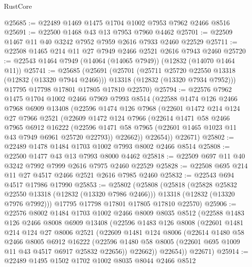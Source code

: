 \begin{lexlean}{RustCore}
\begin{coremodule}
@25685 := @22489 @1469 @1475 @1704 @1002 @7953 @7962 @2466 @8516
@25691 := @22500 @1468 @43 @13 @7953 @7960 @4462
@25701 := @22509 @1467 @11 @40 @3242 @7952 @7959 @2616 @7933 @2460 @22529
@25711 := @22508 @1465 @214 @11 @27 @7949 @2466 @2521 @2616 @7943 @2460
@25720 := @22543 @1464 @7949 (@14064 (@14065 @7949)) (@12832 (@14070 @1464 @11))
@25741 := @25685
    (@25691
      (@25701
        (@25711 @25720 @22550 @13318 (@12832 (@13320 @7944 @2466)))
        @13318
        (@12832 (@13320 @7934 @7952)))
      @17795
      @17798
      @17801
      @17805
      @17810
      @22570)
@25794 := @22576
    @7962
    @1475
    @1704
    @1002
    @2466
    @7969
    @7993
    @8514
    (@22588
      @1474
      @126
      @2466
      @7968
      @6909
      @13408
      (@22596
        @1474
        @126
        @7968
        (@22601
          @1472
          @214
          @124
          @27
          @7966
          @2521
          (@22609
            @1472
            @124
            @7966
            (@22614
              @1471
              @58
              @2466
              @7965
              @6912
              @16222
              (@22596 @1471 @58 @7965 (@22601 @1465 @1023 @11 @43 @7949 @6961 @25720 @22793))
              @22662))
          @22654))
      @22671)
@25802 := @22489 @1478 @1484 @1703 @1002 @7993 @8002 @2466 @8514
@25808 := @22500 @1477 @43 @13 @7993 @8000 @4462
@25818 := @22509 @697 @11 @40 @3242 @7992 @7999 @2616 @7975 @2460 @22529
@25828 := @22508 @695 @214 @11 @27 @4517 @2466 @2521 @2616 @7985 @2460
@25832 := @22543 @694 @4517 @17986 @17990
@25853 := @25802
    (@25808
      (@25818
        (@25828 @25832 @22550 @13318 (@12832 (@13320 @7986 @2466)))
        @13318
        (@12832 (@13320 @7976 @7992)))
      @17795
      @17798
      @17801
      @17805
      @17810
      @22570)
@25906 := @22576
    @8002
    @1484
    @1703
    @1002
    @2466
    @8009
    @8035
    @8512
    (@22588
      @1483
      @126
      @2466
      @8008
      @6909
      @13408
      (@22596
        @1483
        @126
        @8008
        (@22601
          @1481
          @214
          @124
          @27
          @8006
          @2521
          (@22609
            @1481
            @124
            @8006
            (@22614
              @1480
              @58
              @2466
              @8005
              @6912
              @16222
              (@22596 @1480 @58 @8005 (@22601 @695 @1009 @11 @43 @4517 @6917 @25832 @22656))
              @22662))
          @22654))
      @22671)
@25914 := @22489 @1495 @1502 @1702 @1002 @8035 @8044 @2466 @8512

\end{coremodule}
\end{lexlean}
